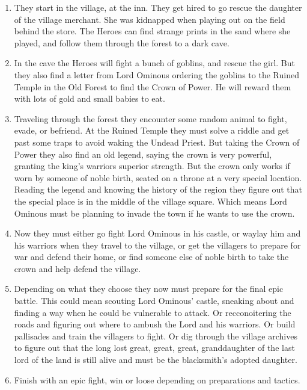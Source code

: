 \begin{enumerate}

\item They start in the village, at the inn. They get hired to go rescue the daughter of the village merchant. She was kidnapped when playing out on the field behind the store. The Heroes can find strange prints in the sand where she played, and follow them through the forest to a dark cave. 

\item In the cave the Heroes will fight a bunch of goblins, and rescue the girl. But they also find a letter from Lord Ominous ordering the goblins to the Ruined Temple in the Old Forest to find the Crown of Power. He will reward them with lots of gold and small babies to eat.

\item Traveling through the forest they encounter some random animal to fight, evade, or befriend. At the Ruined Temple they must solve a riddle and get past some traps to avoid waking the Undead Priest.
But taking the Crown of Power they also find an old legend, saying the crown is very powerful, granting the king's warriors superior strength. But the crown only works if worn by someone of noble birth, seated on a throne at a very special location. Reading the legend and knowing the history of the region they figure out that the special place is in the middle of the village square. Which means Lord Ominous must be planning to invade the town if he wants to use the crown.

\item Now they must either go fight Lord Ominous in his castle, or waylay him and his warriors when they travel to the village, or get the villagers to prepare for war and defend their home, or find someone else of noble birth to take the crown and help defend the village.

\item Depending on what they choose they now must prepare for the final epic battle. This could mean scouting Lord Ominous' castle, sneaking about and finding a way when he could be vulnerable to attack. Or recconoitering the roads and figuring out where to ambush the Lord and his warriors. Or build pallisades and train the villagers to fight. Or dig through the village archives to figure out that the long lost great, great, great, granddaughter of the last lord of the land is still alive and must be the blacksmith's adopted daughter.

\item Finish with an epic fight, win or loose depending on preparations and tactics.

\end{enumerate}

